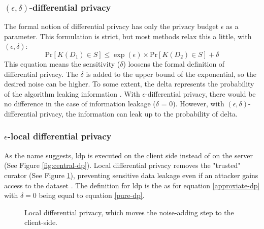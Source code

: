 \subsubsection{$(\epsilon, \delta)$-differential privacy}
The formal notion of differential privacy has only the privacy budget $\epsilon$ as a parameter.
This formulation is strict, but most methods relax this a little, with $(\epsilon, \delta)$:
\begin{equation}
  {\mathrm{Pr}}[K(D_{1})\in S]\leq\exp(\epsilon)\times{\mathrm{Pr}}[K(D_{2})\in S] + \delta
  \label{approxiate-dp}
\end{equation}
This equation means the sensitivity ($\delta$) loosens the formal definition of differential privacy.
The $\delta$ is added to the upper bound of the exponential, so the desired noise can be higher.
To some extent, the delta represents the probability of the algorithm leaking information \citep{aitsam_differential_2021}.
With $\epsilon$-differential privacy, there would be no difference in the case of information leakage ($\delta$ = 0).
However, with $(\epsilon, \delta)$-differential privacy, the information can leak up to the probability of delta.
\newpage
\subsubsection{$\epsilon$-local differential privacy}
As the name suggests, \gls{ldp} is executed on the client side instead of on the server (See Figure \ref{fig:central-dp}).
Local differential privacy removes the "trusted" curator (See Figure \ref{fig:local-dp}), preventing sensitive data leakage even if an attacker gains access to the dataset \citep{del_rey_comprehensive_2020}.
The definition for \gls{ldp} is the as for equation \ref{approxiate-dp} with $\delta = 0$ being equal to equation \ref{pure-dp}.
\begin{figure}[ht]
  
  \caption{Local differential privacy, which moves the noise-adding step to the client-side.}
  \label{fig:local-dp}
\end{figure}

